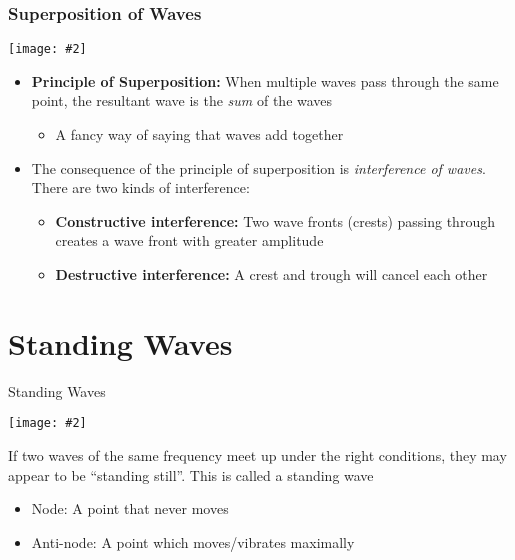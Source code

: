 \documentclass[12pt,aspectratio=169]{beamer}
\newcommand{\pic}[2]{\texttt{[image: \#2]}}
\begin{document}
\begin{frame}
  \frametitle{Superposition of Waves}
  \begin{center}
    \pic{.6}{omkAt.png}
  \end{center}
  \begin{itemize}
  \item\textbf{Principle of Superposition:} When multiple waves pass through
    the same point, the resultant wave is the \emph{sum} of the waves
    \begin{itemize}
    \item A fancy way of saying that waves add together
    \end{itemize}
  \item The consequence of the principle of superposition is
    \emph{interference of waves}. There are two kinds of interference:
    \begin{itemize}
    \item\textbf{Constructive interference:} Two wave fronts (crests) passing
      through creates a wave front with greater amplitude
    \item\textbf{Destructive interference:} A crest and trough will cancel
      each other
    \end{itemize}
  \end{itemize}
\end{frame}

\section{Standing Waves}

\begin{frame}{Standing Waves}
  \begin{center}
    \pic{.6}{standing-wave-3.png}
  \end{center}
  If two waves of the same frequency meet up under the right conditions, they
  may appear to be ``standing still''. This is called a standing wave
  \begin{itemize}
  \item Node: A point that never moves
  \item Anti-node: A point which moves/vibrates maximally
  \end{itemize}
\end{frame}
\end{document}
